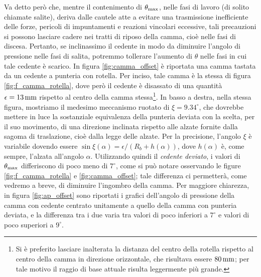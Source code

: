 \noindent Va detto per\`o che, mentre il contenimento di $\theta_{\rm max}$, nelle
fasi di lavoro (di solito chiamate salite),
deriva dalle cautele atte a  evitare una trasmissione
inefficiente delle forze, pericoli di impuntamenti e reazioni vincolari eccessive,
tali precauzioni si possono lasciare cadere 
nei tratti di riposo della camma, cio\`e nelle fasi  di discesa.
Pertanto, se inclinassimo il cedente in modo da diminuire l'angolo di pressione 
nelle fasi di salita, potremmo tollerare l'aumento di $\theta$
nelle fasi in cui tale cedente \`e scarico.
In figura \ref{fig:camma_offset} \`e riportata una camma tastata da un cedente a punteria con
rotella. Per inciso, tale camma \`e la stessa di figura
\ref{fig:f_camma_rotella}, dove per\`o il cedente
\`e disassato di una quantit\`a $\epsilon= 13\,{\rm mm}$ rispetto al centro
della camma stessa\footnote{Si \`e preferito lasciare inalterata la distanza del centro della rotella rispetto al centro della camma
in direzione orizzontale, che risultava essere
$80\,{\rm mm}$; per tale motivo il raggio di base attuale risulta leggermente pi\`u grande.}.
In basso a destra, nella stessa figura, mostriamo il medesimo meccanismo
ruotato di $\xi=9.34^{\circ}$, che dovrebbe mettere in luce la sostanziale
equivalenza della punteria deviata
con la scelta, per il suo movimento, di una direzione inclinata rispetto alle
 alzate fornite dalla sagoma di traslazione, cio\`e dalla legge delle alzate.
Per la precisione,
 l'angolo $\xi$ \`e variabile dovendo essere
$\sin\xi(\alpha)=\epsilon / (R_b + h(\alpha))$, dove $h(\alpha)$
\`e, come sempre, l'alzata all'angolo $\alpha$.
Utilizzando quindi il {\em cedente deviato},
i valori di $\theta_{\rm max}$
 differiscono di poco meno di $7^{\circ}$,
 come si pu\`o notare osservando le figure \ref{fig:f_camma_rotella} e
 \ref{fig:camma_offset};
tale differenza
ci permetter\`a, come vedremo a breve, di diminuire l'ingombro della camma.
Per maggiore chiarezza, in figura \ref{fig:ap_offset} sono
riportati i grafici dell'angolo di pressione della camma con
cedente centrato unitamente a quello della
camma con punteria deviata, e la differenza tra i due varia
tra valori di poco inferiori a
$7^{\circ}$ e valori di poco superiori a $9^{\circ}$.

